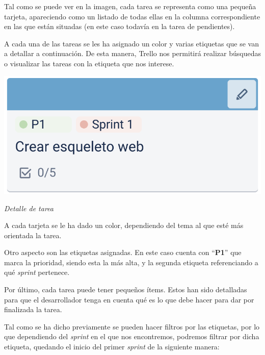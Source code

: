 \documentclass{\ClassPath/viu-tfm-template}
\begin{document}
\vspace{10pt}
Tal como se puede ver en la imagen, cada tarea se representa como una pequeña tarjeta, apareciendo como un listado de todas ellas en la columna correspondiente en las que están situadas (en este caso todavía en la tarea de pendientes).

A cada una de las tareas se les ha asignado un color y varias etiquetas que se van a detallar a continuación. De esta manera, Trello nos permitirá realizar búsquedas o visualizar las tareas con la etiqueta que nos interese.


\begin{minipage}{0.48\linewidth}
    \includegraphics[width=\linewidth]{img/tarea.png}
    \vspace{-35pt}
    \begin{center}
        {\scriptsize \textit{Detalle de tarea}}
    \end{center}
\end{minipage}
\hfill
\begin{minipage}{0.47\linewidth}
    A cada tarjeta se le ha dado un color, dependiendo del tema al que esté más orientada la tarea.

    Otro aspecto son las etiquetas asignadas. En este caso cuenta con “\textbf{P1}” que marca la prioridad, siendo esta la más alta, y la segunda etiqueta referenciando a qué \textit{sprint} pertenece.
\end{minipage}

Por último, cada tarea puede tener pequeños ítems. Estos han sido detalladas para que el desarrollador tenga en cuenta qué es lo que debe hacer para dar por finalizada la tarea.

Tal como se ha dicho previamente se pueden hacer filtros por las etiquetas, por lo que dependiendo del \textit{sprint} en el que nos encontremos, podremos filtrar por dicha etiqueta, quedando el inicio del primer \textit{sprint} de la siguiente manera:
\end{document}
